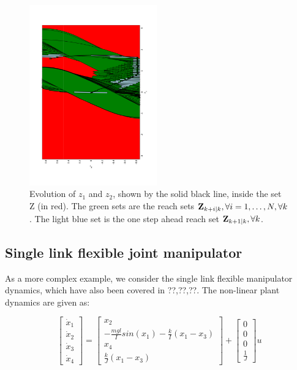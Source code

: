 \begin{figure}
\includegraphics[angle=270,width=0.49\textwidth]{figs/z_trajectory_new.pdf}
\caption{Evolution of $z_1$ and $z_2$, shown by the solid black line, inside the set Z (in red). The green sets are the reach sets $\mathbf{Z}_{k+i|k},\forall i=1,\dotsc,N, \forall k$. The light blue set is the one step ahead reach set $\mathbf{Z}_{k+1|k},\forall k$.}
\label{fig:z_new_toy}
\end{figure}


\subsection{Single link flexible joint manipulator}

As a more complex example, we consider the single link flexible manipulator dynamics, which have also been covered in ??,??,??. The non-linear plant dynamics are given as:

\begin{equation}
\begin{bmatrix} \dot{x}_1 \\ \dot{x}_2 \\ \dot{x}_3 \\ \dot{x}_4    \end{bmatrix} = \begin{bmatrix} x_2 \\ -\frac{mgl}{I}sin(x_1) - \frac{k}{I}(x_1-x_3)  \\ x_4 \\ \frac{k}{J}(x_1-x_3)  \end{bmatrix} + \begin{bmatrix} 0 \\ 0 \\ 0 \\ \frac{1}{J} \end{bmatrix}u
\end{equation}

